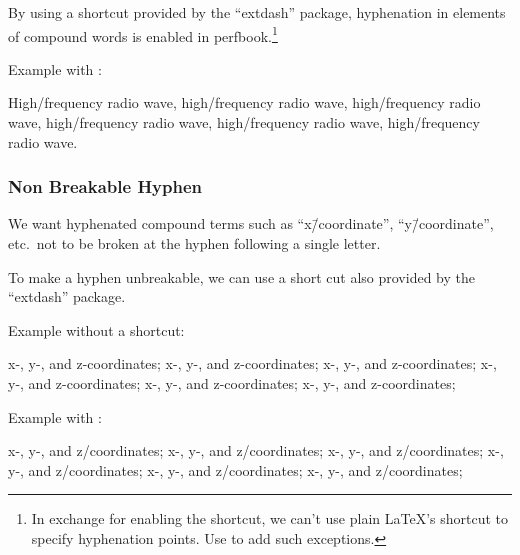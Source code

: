 By using a shortcut \qco{\\-/} provided by the
``extdash'' package, hyphenation in elements of compound
words is enabled in perfbook.\footnote{
  In exchange for enabling the shortcut, we can't use plain
  \LaTeX's shortcut \qco{\\-} to specify hyphenation points.
  Use  to add such exceptions.
}

Example with \qco{\\-/}:

\begin{center}\begin{minipage}{2.6in}\vspace{0.6\baselineskip}
  High\-/frequency radio wave, high\-/frequency radio wave,
  high\-/frequency radio wave, high\-/frequency radio wave,
  high\-/frequency radio wave, high\-/frequency radio wave.
\vspace{0.6\baselineskip}\end{minipage}\end{center}

\subsubsection{Non Breakable Hyphen}
\label{sec:app:styleguide:Non Breakable Hyphen}

We want hyphenated compound terms such as ``x\=/coordinate'',
``y\=/coordinate'', etc.\ not to be broken at the hyphen
following a single letter.

To make a hyphen unbreakable, we can use a short cut
\qco{\\=/} also provided by the ``extdash'' package.

Example without a shortcut:

\begin{center}\begin{minipage}{2.55in}\vspace{0.6\baselineskip}
x-, y-, and z-coordinates; x-, y-, and z-coordinates;
x-, y-, and z-coordinates; x-, y-, and z-coordinates;
x-, y-, and z-coordinates; x-, y-, and z-coordinates;
\vspace{0.6\baselineskip}\end{minipage}\end{center}

Example with \qco{\\-/}:

\begin{center}\begin{minipage}{2.55in}\vspace{0.6\baselineskip}
x-, y-, and z\-/coordinates; x-, y-, and z\-/coordinates;
x-, y-, and z\-/coordinates; x-, y-, and z\-/coordinates;
x-, y-, and z\-/coordinates; x-, y-, and z\-/coordinates;
\vspace{0.6\baselineskip}\end{minipage}\end{center}

